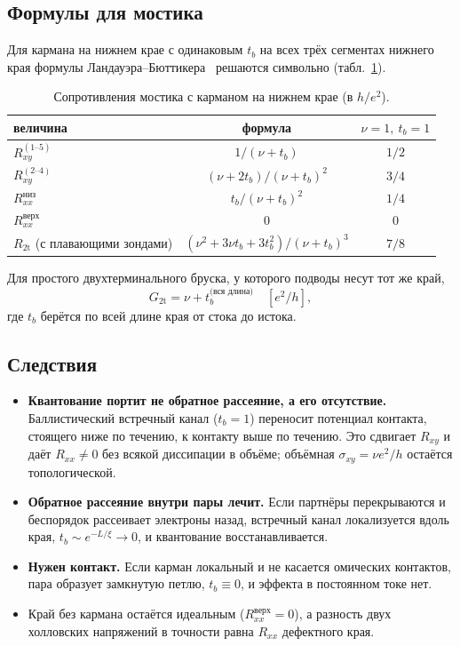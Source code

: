 \documentclass[11pt,a4paper]{article}
\newcommand{\tb}{t_b}
\newcommand{\he}{h/e^2}
\newcommand{\Rxy}{R_{xy}}
\newcommand{\Rxx}{R_{xx}}
\begin{document}
\subsection{Формулы для мостика}
Для кармана на нижнем крае с одинаковым $\tb$ на всех трёх сегментах
нижнего края формулы Ландауэра--Бюттикера~\cite{buttiker} решаются
символьно (табл.~\ref{tab:lb}).

\begin{table}[ht]
\centering
\caption{Сопротивления мостика с карманом на нижнем крае (в $\he$).}
\label{tab:lb}
\begin{tabular}{lcc}
\toprule
величина & формула & $\nu=1,\ \tb=1$\\
\midrule
$\Rxy^{(1\text{--}5)}$ & $1/(\nu+\tb)$ & $1/2$\\
$\Rxy^{(2\text{--}4)}$ & $(\nu+2\tb)/(\nu+\tb)^2$ & $3/4$\\
$\Rxx^\text{низ}$ & $\tb/(\nu+\tb)^2$ & $1/4$\\
$\Rxx^\text{верх}$ & $0$ & $0$\\
$R_\text{2t}$ (с плавающими зондами) & $(\nu^2+3\nu\tb+3\tb^2)/(\nu+\tb)^3$ & $7/8$\\
\bottomrule
\end{tabular}
\end{table}

Для простого двухтерминального бруска, у которого подводы несут тот же край,
\begin{equation}\label{eq:g2t}
G_\text{2t}=\nu+\tb^{\text{(вся длина)}}\quad[e^2/h],
\end{equation}
где $\tb$ берётся по всей длине края от стока до истока.

\subsection{Следствия}
\begin{itemize}
\item \textbf{Квантование портит не обратное рассеяние, а его отсутствие.}
  Баллистический встречный канал ($\tb=1$) переносит потенциал контакта,
  стоящего ниже по течению, к контакту выше по течению. Это сдвигает
  $\Rxy$ и даёт $\Rxx\neq0$ без всякой диссипации в объёме; объёмная
  $\sigma_{xy}=\nu e^2/h$ остаётся топологической.
\item \textbf{Обратное рассеяние внутри пары лечит.} Если партнёры
  перекрываются и беспорядок рассеивает электроны назад, встречный канал
  локализуется вдоль края, $\tb\sim e^{-L/\xi}\to0$, и квантование
  восстанавливается.
\item \textbf{Нужен контакт.} Если карман локальный и не касается
  омических контактов, пара образует замкнутую петлю, $\tb\equiv0$, и
  эффекта в постоянном токе нет.
\item Край без кармана остаётся идеальным ($\Rxx^\text{верх}=0$), а разность
  двух холловских напряжений в точности равна $\Rxx$ дефектного края.
\end{itemize}
\end{document}
